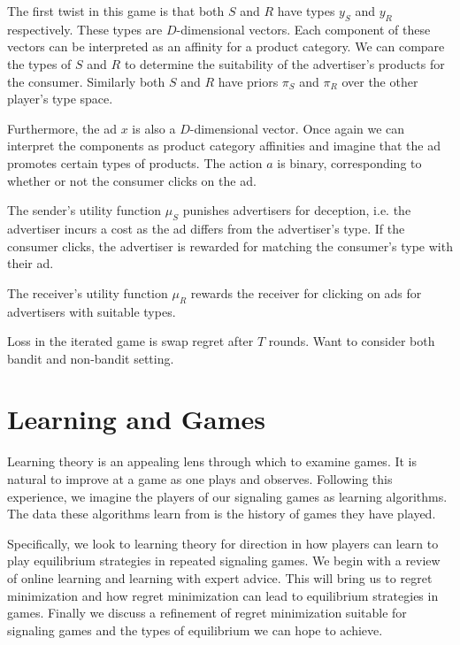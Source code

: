 \documentclass{article}
\begin{document}
\noindent The first twist in this game is that both $S$ and $R$ have types $y_S$ and $y_R$ respectively. These types are $D$-dimensional vectors. Each component of these vectors can be interpreted as an affinity for a product category. We can compare the types of $S$ and $R$ to determine the suitability of the advertiser's products for the consumer. Similarly both $S$ and $R$ have priors $\pi_S$ and $\pi_R$ over the other player's type space.

Furthermore, the ad $x$ is also a $D$-dimensional vector. Once again we can interpret the components as product category affinities and imagine that the ad promotes certain types of products. The action $a$ is binary, corresponding to whether or not the consumer clicks on the ad.

The sender's utility function $\mu_S$ punishes advertisers for deception, i.e. the advertiser incurs a cost as the ad differs from the advertiser's type. If the consumer clicks, the advertiser is rewarded for matching the consumer's type with their ad. 

The receiver's utility function $\mu_R$ rewards the receiver for clicking on ads for advertisers with suitable types.

Loss in the iterated game is swap regret after $T$ rounds. Want to consider both bandit and non-bandit setting. 


\section{Learning and Games}

Learning theory is an appealing lens through which to examine games. It is natural to improve at a game as one plays and observes. Following this experience, we imagine the players of our signaling games as learning algorithms. The data these algorithms learn from is the history of games they have played. 

Specifically, we look to learning theory for direction in how players can learn to play equilibrium strategies in repeated signaling games. We begin with a review of online learning and learning with expert advice. This will bring us to regret minimization and how regret minimization can lead to equilibrium strategies in games. Finally we discuss a refinement of regret minimization suitable for signaling games and the types of equilibrium we can hope to achieve.
\end{document}
